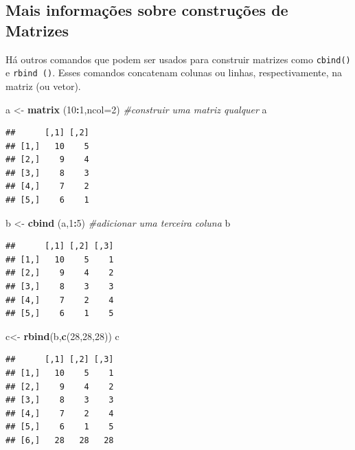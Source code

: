 \documentclass[
]{book}
\newenvironment{Shaded}{\begin{snugshade}}{\end{snugshade}}
\newcommand{\CommentTok}[1]{\textcolor[rgb]{0.56,0.35,0.01}{\textit{#1}}}
\newcommand{\DataTypeTok}[1]{\textcolor[rgb]{0.13,0.29,0.53}{#1}}
\newcommand{\DecValTok}[1]{\textcolor[rgb]{0.00,0.00,0.81}{#1}}
\newcommand{\KeywordTok}[1]{\textcolor[rgb]{0.13,0.29,0.53}{\textbf{#1}}}
\newcommand{\NormalTok}[1]{#1}
\newcommand{\OperatorTok}[1]{\textcolor[rgb]{0.81,0.36,0.00}{\textbf{#1}}}
\newcommand{\StringTok}[1]{\textcolor[rgb]{0.31,0.60,0.02}{#1}}
\begin{document}
\hypertarget{mais-informauxe7uxf5es-sobre-construuxe7uxf5es-de-matrizes}{%
\subsection{Mais informações sobre construções de Matrizes}\label{mais-informauxe7uxf5es-sobre-construuxe7uxf5es-de-matrizes}}

Há outros comandos que podem ser usados para construir matrizes como \texttt{cbind()} e \texttt{rbind\ ()}. Esses comandos concatenam colunas ou linhas, respectivamente, na matriz (ou vetor).

\begin{Shaded}
\begin{Highlighting}[]
\NormalTok{a <-}\StringTok{ }\KeywordTok{matrix}\NormalTok{ (}\DecValTok{10}\OperatorTok{:}\DecValTok{1}\NormalTok{,}\DataTypeTok{ncol=}\DecValTok{2}\NormalTok{) }\CommentTok{#construir uma matriz qualquer}
\NormalTok{a}
\end{Highlighting}
\end{Shaded}

\begin{verbatim}
##      [,1] [,2]
## [1,]   10    5
## [2,]    9    4
## [3,]    8    3
## [4,]    7    2
## [5,]    6    1
\end{verbatim}

\begin{Shaded}
\begin{Highlighting}[]
\NormalTok{b <-}\StringTok{ }\KeywordTok{cbind}\NormalTok{ (a,}\DecValTok{1}\OperatorTok{:}\DecValTok{5}\NormalTok{) }\CommentTok{#adicionar uma terceira coluna}
\NormalTok{b}
\end{Highlighting}
\end{Shaded}

\begin{verbatim}
##      [,1] [,2] [,3]
## [1,]   10    5    1
## [2,]    9    4    2
## [3,]    8    3    3
## [4,]    7    2    4
## [5,]    6    1    5
\end{verbatim}

\begin{Shaded}
\begin{Highlighting}[]
\NormalTok{c<-}\StringTok{ }\KeywordTok{rbind}\NormalTok{(b,}\KeywordTok{c}\NormalTok{(}\DecValTok{28}\NormalTok{,}\DecValTok{28}\NormalTok{,}\DecValTok{28}\NormalTok{))}
\NormalTok{c}
\end{Highlighting}
\end{Shaded}

\begin{verbatim}
##      [,1] [,2] [,3]
## [1,]   10    5    1
## [2,]    9    4    2
## [3,]    8    3    3
## [4,]    7    2    4
## [5,]    6    1    5
## [6,]   28   28   28
\end{verbatim}
\end{document}
